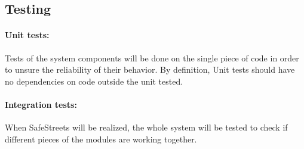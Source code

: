 \subsection{Testing}

\paragraph{Unit tests:}
Tests of the system components will be done on the single piece of code in order to unsure the reliability of their behavior.
By definition, Unit tests should have no dependencies on code outside the unit tested.

\paragraph{Integration tests:}
When SafeStreets will be realized, the whole system will be tested to check if different pieces of the modules are working together.

